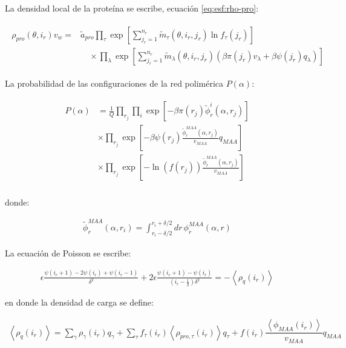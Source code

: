 La densidad local de la prote\'ina  se escribe, ecuaci\'on \ref{eq:esf:rho-pro}:

\begin{align}
	\begin{aligned}
		\rho_{pro}(\theta, i_r)v_w = &\tilde{a}_{pro} \prod_\tau\exp\left[ \sum^{n_r}_{j_r = 1} \tilde{m}_\tau(\theta,i_r,j_r) \ln f_\tau(j_r)\right] \\
		& \hspace{1em} \times \prod_\lambda \exp \left[ \sum^{n_r}_{j_r = 1} \tilde{m}_\lambda(\theta,i_r, j_r)\left(\beta\pi(j_r) v_\lambda+ \beta \psi(j_r)q_\lambda\right) \right]
	\end{aligned}
\end{align}

La probabilidad de las configuraciones de la red polim\'erica $P(\alpha)$: 

\begin{align}
	\begin{aligned}
		P(\alpha)&= \frac{1}{Q}\prod_{r_j}\prod_i \exp\left[{- {\beta\pi(r_j) \tilde{\phi}^i_r(\alpha,r_j)}}\right] \\
		& \times \prod_{r_j} \exp \left[ - \beta \psi(r_j)\frac{\tilde{ \phi}^{MAA}_r(\alpha,r_j)}{v_{MAA}} q_{MAA}  \right] \\
		& \times \prod_{r_j} \exp\left[ - { \ln(f(r_j))\frac{\tilde{ \phi}^{MAA}_r(\alpha,r_j)}{v_{MAA}}}\right] \\
	\end{aligned}
\end{align}

\noindent donde:

\begin{align}
	\tilde{ \phi}^{MAA}_r(\alpha,r_i) = \int_{r_i -\delta/2}^{r_i + \delta/2} dr \, \phi^{MAA}_r(\alpha,r)
\end{align}

La ecuaci\'on de Poisson se escribe:

\begin{align}
	\epsilon \frac{\psi(i_r +1) -2 \psi(i_r) + \psi(i_r -1)}{\delta ^2} + 2\epsilon \frac{\psi(i_r +1) -\psi(i_r)}{(i_r -\frac{1}{2})\delta ^2}= -\left<\rho_q(i_r)\right>
	\label{eq:esf:poisson-ir}
\end{align}

\noindent en donde la densidad de carga se define:

\begin{align}
	\left<\rho_q(i_r)\right> = \sum_{\gamma } {\rho_\gamma(i_r) q_\gamma + \sum_\tau{f_\tau(i_r) \left<\rho_{pro,\tau}(i_r)\right> q_\tau} +  f(i_r)\dfrac{\left<\phi_{MAA}(i_r)\right>}{v_{MAA}}q_{MAA}}
\end{align}

